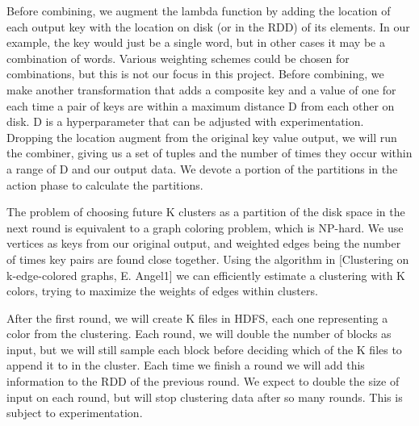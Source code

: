 \documentclass[12pt]{extarticle}
\begin{document}
Before combining, we augment the lambda function by adding the location of each output key with the location on disk (or in the RDD) of its elements.  In our example, the key would just be a single word, but in other cases it may be a combination of words.  Various weighting schemes could be chosen for combinations, but this is not our focus in this project.  Before combining, we make another transformation that adds a composite key and a value of one for each time a pair of keys are within a maximum distance D from each other on disk.  D is a hyperparameter that can be adjusted with experimentation.  Dropping the location augment from the original key value output, we will run the combiner, giving us a set of tuples and the number of times they occur within a range of D and our output data.  We devote a portion of the partitions in the action phase to calculate the partitions.   %

The problem of choosing future K clusters as a partition of the disk space in the next round is equivalent to a graph coloring problem, which is NP-hard.  We use vertices as keys from our original output, and weighted edges being the number of times key pairs are found close together.  Using the algorithm in [Clustering on k-edge-colored graphs, E. Angel1] we can efficiently estimate a clustering with K colors, trying to maximize the weights of edges within clusters.

After the first round, we will create K files in HDFS, each one representing a color from the clustering. Each round, we will double the number of blocks as input, but we will still sample each block before deciding which of the K files to append it to in the cluster.  Each time we finish a round we will add this information to the 
RDD of the previous round.  We expect to double the size of input on each round, but will stop clustering data after so many rounds.  This is subject to experimentation.  
\end{document}
